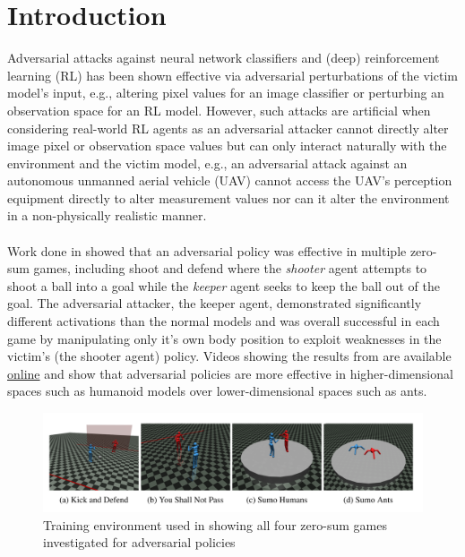 \documentclass{article}
\begin{document}
\section{Introduction}\label{sec:intro}
Adversarial attacks against neural network classifiers and (deep) reinforcement learning (RL) has been shown effective via adversarial perturbations of the victim model's input, e.g., altering pixel values for an image classifier or perturbing an observation space for an RL model. 
However, such attacks are artificial when considering real-world RL agents as an adversarial attacker cannot directly alter image pixel or observation space values but can only interact naturally with the environment and the victim model, e.g., an adversarial attack against an autonomous unmanned aerial vehicle (UAV) cannot access the UAV's perception equipment directly to alter measurement values nor can it alter the environment in a non-physically realistic manner. 
\\ \\ 
\noindent 
Work done in \cite{Gleave2019} showed that an adversarial policy was effective in multiple zero-sum games, including shoot and defend where the \textit{shooter} agent attempts to shoot a ball into a goal while the \textit{keeper} agent seeks to keep the ball out of the goal. 
The adversarial attacker, the keeper agent, demonstrated significantly different activations than the normal models and was overall successful in each game by manipulating only it's own body position to exploit weaknesses in the victim's (the shooter agent) policy.
Videos showing the results from \cite{Gleave2019} are available \href{https://adversarialpolicies.github.io/}{online} and show that adversarial policies are more effective in higher-dimensional spaces such as humanoid models over lower-dimensional spaces such as ants. 

\begin{figure}[h!]
  \includegraphics[width=\linewidth]{imgs/Gleave2019_env}
  \caption{Training environment used in \cite{Gleave2019} showing all four zero-sum games investigated for adversarial policies}
  \label{fig:gleave_env}
\end{figure}
\end{document}
